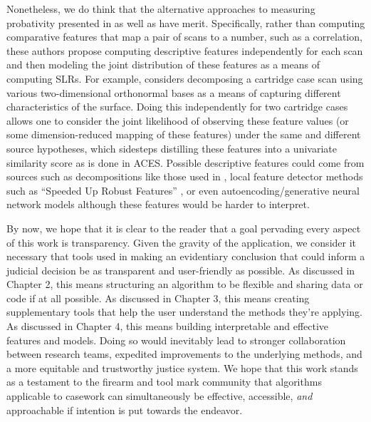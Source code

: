 \documentclass[11pt,]{isuthesis}
\begin{document}
Nonetheless, we do think that the alternative approaches to measuring probativity presented in \citet{Morrison2018} as well as \citet{Basu2022} have merit.
Specifically, rather than computing comparative features that map a pair of scans to a number, such as a correlation, these authors propose computing descriptive features independently for each scan and then modeling the joint distribution of these features as a means of computing SLRs.
For example, \citet{Basu2022} considers decomposing a cartridge case scan using various two-dimensional orthonormal bases as a means of capturing different characteristics of the surface.
Doing this independently for two cartridge cases allows one to consider the joint likelihood of observing these feature values (or some dimension-reduced mapping of these features) under the same and different source hypotheses, which sidesteps distilling these features into a univariate similarity score as is done in ACES.
Possible descriptive features could come from sources such as decompositions like those used in \citet{Basu2022}, local feature detector methods such as ``Speeded Up Robust Features'' \citet{Bay2006}, or even autoencoding/generative neural network models although these features would be harder to interpret.

By now, we hope that it is clear to the reader that a goal pervading every aspect of this work is transparency.
Given the gravity of the application, we consider it necessary that tools used in making an evidentiary conclusion that could inform a judicial decision be as transparent and user-friendly as possible.
As discussed in Chapter 2, this means structuring an algorithm to be flexible and sharing data or code if at all possible.
As discussed in Chapter 3, this means creating supplementary tools that help the user understand the methods they're applying.
As discussed in Chapter 4, this means building interpretable and effective features and models.
Doing so would inevitably lead to stronger collaboration between research teams, expedited improvements to the underlying methods, and a more equitable and trustworthy justice system.
We hope that this work stands as a testament to the firearm and tool mark community that algorithms applicable to casework can simultaneously be effective, accessible, \emph{and} approachable if intention is put towards the endeavor.

\renewcommand\bibname{\centerline{REFERENCES}}
\unappendixtitle
\newpage
{}
{}

\end{document}
